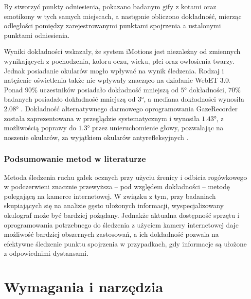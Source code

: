 \documentclass[a4paper,twoside,12pt]{book}
\begin{document}
By stworzyć punkty odniesienia, pokazano badanym gify z kotami oraz emotikony w tych samych miejscach, a następnie obliczono dokładność, mierząc odległości pomiędzy zarejestrowanymi punktami spojrzenia a ustalonymi punktami odniesienia.

Wyniki dokładności wskazały, że system iMotions jest niezależny od zmiennych wynikających z pochodzenia, koloru oczu, wieku, płci oraz owłosienia twarzy. Jednak posiadanie okularów mogło wpływać na wynik śledzenia. Rodzaj i natężenie oświetlenia także nie wpływały znacząco na działanie WebET 3.0. Ponad $90\%$ uczestników posiadało dokładność mniejszą od $\ang{5}$ dokładności, $70\%$ badanych posiadało dokładność mniejszą od $\ang{3}$, a mediana dokładności wynosiła $\ang{2.08}$ \cite{bib:iMotions-WebET}. Dokładność alternatywnego darmowego oprogramowania GazeRecorder została zaprezentowana w przeglądzie systematycznym i wynosiła $\ang{1,43}$, z możliwością poprawy do $\ang{1,3}$ przez unieruchomienie głowy, pozwalając na noszenie okularów, za wyjątkiem okularów antyrefleksyjnych \cite{bib:GazeRecorder-Review}. 

\subsection{Podsumowanie metod w literaturze}
\label{subsec:Podsumowanie-metod-w-literaturze}

Metoda śledzenia ruchu gałek ocznych przy użyciu źrenicy i odbicia rogówkowego w podczerwieni znacznie przewyższa -- pod względem dokładności -- metodę polegającą na kamerce internetowej. W związku z tym, przy badaniach skupiających się na analizie gęsto ułożonych informacji, wyspecjalizowany okulograf może być bardziej pożądany. Jednakże aktualna dostępność sprzętu i oprogramowania potrzebnego do śledzenia z użyciem kamery internetowej daje możliwość bardziej obszernych zastosowań, a ich dokładność pozwala na efektywne śledzenie punktu spojrzenia w przypadkach, gdy informacje są ułożone z odpowiednimi dystansami.











%
%
%
\chapter{Wymagania i narzędzia}
\label{ch:wymagania-i-narzedzia}
\end{document}
